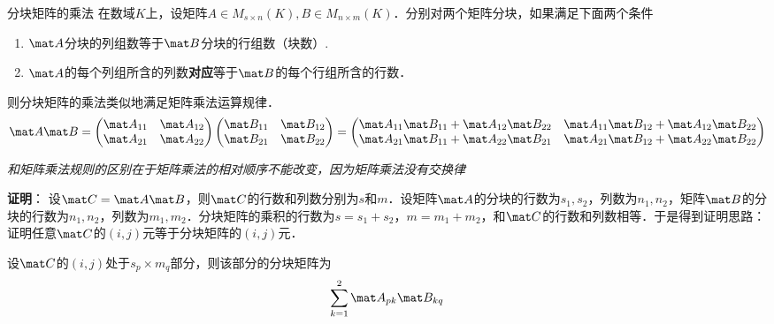 \begin{theorem}{分块矩阵的乘法}
在数域$K$上，设矩阵$A\in{M_{s\times{n}}(K)},B\in{M_{n\times{m}}(K)}$．分别对两个矩阵分块，如果满足下面两个条件
\begin{enumerate}
\item $\mat A$分块的列组数等于$\mat B$分块的行组数（块数）.
\item $\mat A$的每个列组所含的列数\textbf{对应}等于$\mat B$的每个行组所含的行数．
\end{enumerate}
则分块矩阵的乘法类似地满足矩阵乘法运算规律．
\begin{equation}
\mat A\mat B=
\begin{pmatrix}
\mat A_{11} & \mat A_{12}\\
\mat A_{21} & \mat A_{22}
\end{pmatrix}
\begin{pmatrix}
\mat B_{11} & \mat B_{12}\\
\mat B_{21} & \mat B_{22}
\end{pmatrix}
=
\begin{pmatrix}
\mat A_{11}\mat B_{11}+\mat A_{12}\mat B_{22} & \mat A_{11}\mat B_{12}+\mat A_{12}\mat B_{22}\\
\mat A_{21}\mat B_{11}+\mat A_{22}\mat B_{21} & \mat A_{21}\mat B_{12}+\mat A_{22}\mat B_{22}
\end{pmatrix}
\end{equation}
\end{theorem}
\textsl{和矩阵乘法规则的区别在于矩阵乘法的相对顺序不能改变，因为矩阵乘法没有交换律}

\textbf{证明}：
设$\mat C=\mat A\mat B$，则$\mat C$的行数和列数分别为$s$和$m$．设矩阵$\mat A$的分块的行数为$s_1,s_2$，列数为$n_1,n_2$，矩阵$\mat B$的分块的行数为$n_1,n_2$，列数为$m_1,m_2$．分块矩阵的乘积的行数为$s=s_1+s_2$，$m=m_1+m_2$，和$\mat C$的行数和列数相等．于是得到证明思路：证明任意$\mat C$的$(i,j)$元等于分块矩阵的$(i,j)$元．

设$\mat C$的$(i,j)$处于$s_p\times{m_q}$部分，则该部分的分块矩阵为
\[\sum_{k=1}^{2}\mat A_{pk}\mat B_{kq}\]

